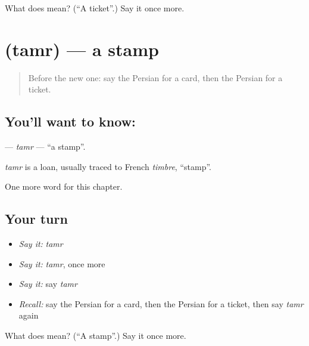 \begin{tcolorbox}[breakable,colback=teal!4,colframe=teal!35!black,title={Before you move on}]
What does  mean? (\textquotedblleft{}A ticket\textquotedblright{}.) Say it once more.
\end{tcolorbox}
\section[\texorpdfstring{\fa{تمبر} (tamr)}{تمبر (tamr)}]{ (tamr) — a stamp}

\label{lesson:FA-C113-tamr}



\begin{quote}
Before the new one: say the Persian for a card, then the Persian for a ticket.
\end{quote}

\subsection*{You'll want to know: }
\textbf{} — \emph{tamr} — \textquotedblleft{}a stamp\textquotedblright{}.

\begin{cousinweb}
\emph{tamr} is a loan, usually traced to French \emph{timbre}, \textquotedblleft{}stamp\textquotedblright{}.
\end{cousinweb}

\begin{grammarlens}[title={What you've built}]
One more word for this chapter.
\end{grammarlens}

\subsection*{Your turn}
\begin{itemize}
\raggedright
  \item \emph{Say it:} \emph{tamr}
  \item \emph{Say it:} \emph{tamr}, once more
  \item \emph{Say it:} say \emph{tamr}
  \item \emph{Recall:} say the Persian for a card, then the Persian for a ticket, then say \emph{tamr} again
\end{itemize}

\begin{tcolorbox}[breakable,colback=teal!4,colframe=teal!35!black,title={Before you move on}]
What does  mean? (\textquotedblleft{}A stamp\textquotedblright{}.) Say it once more.
\end{tcolorbox}
